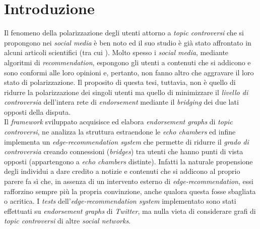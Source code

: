 \chapter{Introduzione}
\label{chap:introduzione}

Il fenomeno della polarizzazione degli utenti attorno a \textit{topic controversi} che si propongono nei \textit{social media} è ben noto ed il suo studio è già stato affrontato in alcuni articoli scientifici (tra cui \cite{musco:paper}\cite{morales:paper}). Molto spesso i \textit{social media}, mediante algoritmi di \textit{recommendation}, espongono gli utenti a contenuti che si addicono e sono conformi alle loro opinioni e, pertanto, non fanno altro che aggravare il loro stato di polarizzazione. Il proposito di questa tesi, tuttavia, non è quello di ridurre la polarizzazione dei singoli utenti ma quello di minimizzare il \textit{livello di controversia} dell'intera rete di \textit{endorsement} mediante il \textit{bridging} dei due lati opposti della disputa.\\Il \textit{framework} sviluppato acquisisce ed elabora \textit{endorsement graphs} di \textit{topic controversi}, ne analizza la struttura estraendone le \textit{echo chambers} ed infine implementa un \textit{edge-recommendation system} che permette di ridurre il \textit{grado di controversia} creando connessioni (\textit{bridges}) tra utenti che hanno punti di vista opposti (appartengono a \textit{echo chambers} distinte). Infatti la naturale propensione degli individui a dare credito a notizie e contenuti che si addicono al proprio parere fa sì che, in assenza di un intervento esterno di \textit{edge-recommendation}, essi rafforzino sempre più la propria convinzione, anche qualora questa fosse sbagliata o acritica. I \textit{tests} dell'\textit{edge-recommendation system} implementato sono stati effettuati su \textit{endorsement graphs} di \textit{Twitter}, ma nulla vieta di considerare grafi di \textit{topic controversi} di altre \textit{social networks}. 

